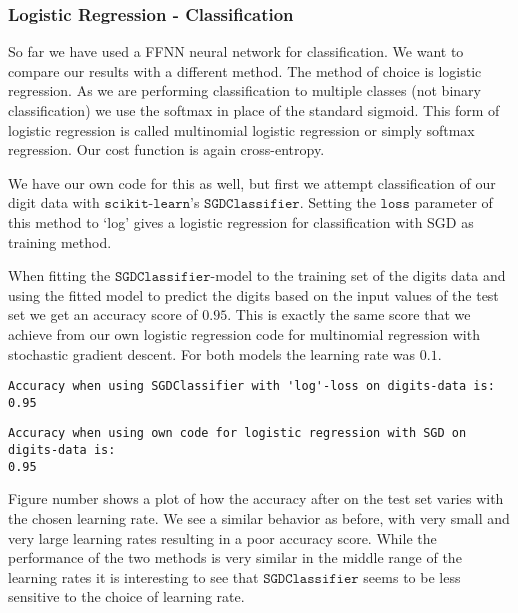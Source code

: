 \documentclass[11pt]{article}
\begin{document}
    \hypertarget{logistic-regression---classification}{%
\subsubsection{Logistic Regression -
Classification}\label{logistic-regression---classification}}

So far we have used a FFNN neural network for classification. We want to
compare our results with a different method. The method of choice is
logistic regression. As we are performing classification to multiple
classes (not binary classification) we use the softmax in place of the
standard sigmoid. This form of logistic regression is called multinomial
logistic regression or simply softmax regression. Our cost function is
again cross-entropy.

We have our own code for this as well, but first we attempt
classification of our digit data with \(\texttt{scikit-learn}\)'s
\(\texttt{SGDClassifier}\). Setting the \(\texttt{loss}\) parameter of
this method to `log' gives a logistic regression for classification with
SGD as training method.

When fitting the \(\texttt{SGDClassifier}\)-model to the training set of
the digits data and using the fitted model to predict the digits based
on the input values of the test set we get an accuracy score of
\(0.95\). This is exactly the same score that we achieve from our own
logistic regression code for multinomial regression with stochastic
gradient descent. For both models the learning rate was \(0.1\).

    \begin{Verbatim}[commandchars=\\\{\}]
Accuracy when using SGDClassifier with 'log'-loss on digits-data is: 0.95
    \end{Verbatim}

    \begin{Verbatim}[commandchars=\\\{\}]
Accuracy when using own code for logistic regression with SGD on digits-data is:
0.95
    \end{Verbatim}

    Figure number shows a plot of how the accuracy after on the test set
varies with the chosen learning rate. We see a similar behavior as
before, with very small and very large learning rates resulting in a
poor accuracy score. While the performance of the two methods is very
similar in the middle range of the learning rates it is interesting to
see that \(\texttt{SGDClassifier}\) seems to be less sensitive to the
choice of learning rate.
\end{document}
